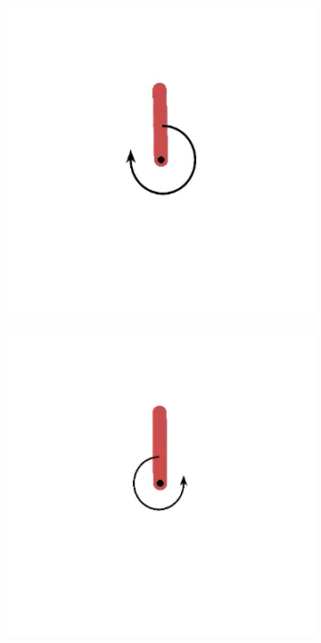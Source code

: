 \documentclass{article}
\begin{document}
\begin{figure}[!p]
\begin{subfigure}{0.18\textwidth}
  \caption{}
  \end{subfigure}
  \begin{subfigure}{0.18\textwidth}
  \centering
  \includegraphics[width=\textwidth]{figures/pendulum/f3}
  \caption{}
  \end{subfigure}
  \begin{subfigure}{0.18\textwidth}
  \centering
  \includegraphics[width=\textwidth]{figures/pendulum/f4}

\end{subfigure}
\end{figure}
\end{document}

